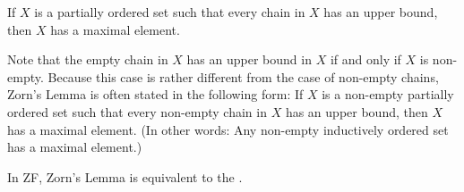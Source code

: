 \documentclass{article}
\begin{document}

If $X$ is a partially ordered set
such that every chain in $X$ has an upper bound,
then $X$ has a maximal element.

Note that the empty chain in $X$ has an upper bound in $X$
if and only if $X$ is non-empty.
Because this case is rather different from the case of non-empty chains,
Zorn's Lemma is often stated in the following form:
If $X$ is a non-empty partially ordered set
such that every non-empty chain in $X$ has an upper bound,
then $X$ has a maximal element.
(In other words: Any non-empty inductively ordered set has a maximal element.)

In ZF, Zorn's Lemma is equivalent to the .
\end{document}
